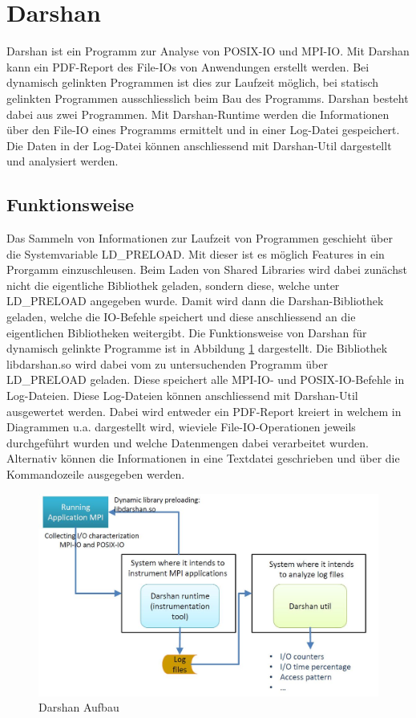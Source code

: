 \section{Darshan}
Darshan ist ein Programm zur Analyse von POSIX-IO und MPI-IO. Mit Darshan kann ein PDF-Report des File-IOs von Anwendungen erstellt werden. Bei dynamisch gelinkten Programmen ist dies zur Laufzeit m\"oglich, bei statisch gelinkten Programmen ausschliesslich beim Bau des Programms.\newline
Darshan besteht dabei aus zwei Programmen. Mit Darshan-Runtime werden die Informationen \"uber den File-IO eines Programms ermittelt und in einer Log-Datei gespeichert. Die Daten in der Log-Datei k\"onnen anschliessend mit Darshan-Util dargestellt und analysiert werden.
\subsection{Funktionsweise}
Das Sammeln von Informationen zur Laufzeit von Programmen geschieht \"uber die Systemvariable LD\_PRELOAD. Mit dieser ist es m\"oglich Features in ein Prorgamm einzuschleusen. Beim Laden von Shared Libraries wird dabei zun\"achst nicht die eigentliche Bibliothek geladen, sondern diese, welche unter LD\_PRELOAD angegeben wurde. Damit wird dann die Darshan-Bibliothek geladen, welche die IO-Befehle speichert und diese anschliessend an die eigentlichen Bibliotheken weitergibt. Die Funktionsweise von Darshan f\"ur dynamisch gelinkte Programme ist in Abbildung \ref{fig:darshan} dargestellt. Die Bibliothek libdarshan.so wird dabei vom zu untersuchenden Programm \"uber LD\_PRELOAD geladen. Diese speichert alle MPI-IO- und POSIX-IO-Befehle in Log-Dateien. Diese Log-Dateien k\"onnen anschliessend mit Darshan-Util ausgewertet werden. Dabei wird entweder ein PDF-Report kreiert in welchem in Diagrammen u.a. dargestellt wird, wieviele File-IO-Operationen jeweils durchgef\"uhrt wurden und welche Datenmengen dabei verarbeitet wurden. Alternativ k\"onnen die Informationen in eine Textdatei geschrieben und \"uber die Kommandozeile ausgegeben werden.

\begin{figure}[h]
	\centering
	\includegraphics[width=12cm]{fig/Darshan.jpg}
	\caption{Darshan Aufbau \cite{Mendez.23.06.2016}}
	\label{fig:darshan}
\end{figure}

